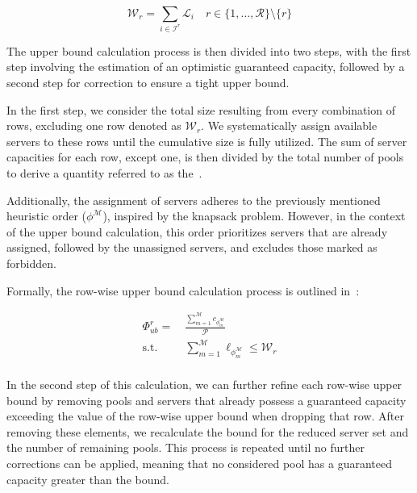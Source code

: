 \begin{equation}
  \label{eq:odc-relax}
  \mathcal{W}_{r} = \sum_{i \in \mathcal{I}^r} \mathcal{L}_{i} \quad r \in \{1, \ldots, \mathcal{R}\} \setminus \{ r \}
\end{equation}

The upper bound calculation process is then divided into two steps, with the
first step involving the estimation of an optimistic guaranteed capacity,
followed by a second step for correction to ensure a tight upper bound.

In the first step, we consider the total size resulting from every combination
of rows, excluding one row denoted as $\mathcal{W}_r$. We systematically assign
available servers to these rows until the cumulative size is fully utilized. The
sum of server capacities for each row, except one, is then divided by the total
number of pools to derive a quantity referred to as the~.

Additionally, the assignment of servers adheres to the previously mentioned
heuristic order ($\phi^\mathcal{M}$), inspired by the knapsack problem. However,
in the context of the upper bound calculation, this order prioritizes servers
that are already assigned, followed by the unassigned servers, and excludes
those marked as forbidden.

Formally, the row-wise upper bound calculation process is outlined
in~:

\begin{equation}
  \label{eq:odc-rowise-bound}
  \begin{aligned}
    \Phi_{ub}^{r} =\  & \frac{\sum_{m = 1}^{\mathcal{M}} c_{\phi_{m}^\mathcal{M}}}{\mathcal{P}}     \\
    \text{s.t. }      & \sum_{m = 1}^{\mathcal{M}} \ell_{\phi_{m}^\mathcal{M}} \leq \mathcal{W}_{r} \\
  \end{aligned}
\end{equation}

In the second step of this calculation, we can further refine each row-wise
upper bound by removing pools and servers that already possess a guaranteed
capacity exceeding the value of the row-wise upper bound when dropping that row.
After removing these elements, we recalculate the bound for the reduced server
set and the number of remaining pools. This process is repeated until no further
corrections can be applied, meaning that no considered pool has a guaranteed
capacity greater than the bound.


